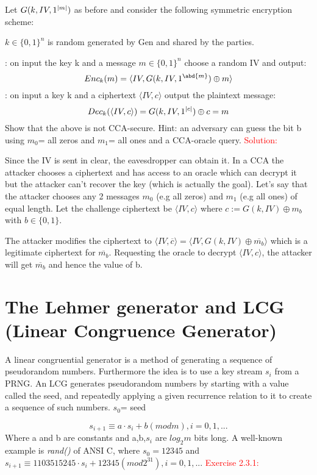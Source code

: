 \documentclass{article}
\newcommand*\xor{\mathbin{\oplus}}
\begin{document}
Let $G(k,IV,1^{\abs{m}})$ as before and consider the following symmetric encryption scheme:

$k \in \{0,1\}^n$ is random generated by Gen and shared by the parties.

: on input the key k and a message $m \in \{0,1\}^n$ choose a random IV and output:
\begin{equation*}
    Enc_k(m)=\langle IV,G(k,IV,1^{\abd{m}}) \xor m \rangle
\end{equation*}
: on input a key k and a ciphertext $\langle IV,c \rangle$ output the plaintext message:
\begin{equation*}
    Dec_k(\langle IV,c \rangle)=G(k,IV,1^{\abs{c}}) \xor c=m
\end{equation*}
Show that the above is not CCA-secure. Hint: an adversary can guess the bit b using $m_0$= all zeros and $m_1$= all ones and a CCA-oracle query. \newline
\textcolor{red}{Solution:}

Since the IV is sent in clear, the eavesdropper can obtain it. In a CCA the attacker chooses a ciphertext and has access to an oracle which can decrypt it but the attacker can't recover the key (which is actually the goal).
Let's say that the attacker chooses any 2 messages $m_0$ (e.g all zeros) and $m_1$ (e.g all ones) of equal length.
Let the challenge ciphertext be $\langle IV,c \rangle$ where $c:=G(k,IV)\xor m_b$ with $b \in \{0,1\}$.

The attacker modifies the ciphertext to $\langle IV,\overline{ c}\rangle = \langle IV,G(k,IV)\xor \overline{m_b}\rangle$ which is a legitimate ciphertext for $\overline{m_b}$. Requesting the oracle to decrypt $\langle IV,c\rangle$, the attacker will get $\overline{m_b}$ and hence the value of b.

\section{The Lehmer generator and LCG (Linear Congruence Generator)}
A linear congruential generator is a method of generating a sequence of pseudorandom numbers. Furthermore the idea is to use a key stream $s_i$ from a PRNG. An LCG generates pseudorandom numbers by starting with a value called the seed, and repeatedly applying a given recurrence relation to it to create a sequence of such numbers. 
$s_0$= seed

\begin{equation*}
    s_{i+1} \equiv a\cdot s_i + b(mod m), i=0,1,...
\end{equation*}
Where a and b are constants and a,b,$s_i$ are $log_2m$ bits long.
A well-known example is \textit{rand()} of ANSI C, where $s_0 = 12345$ and $s_{i+1} \equiv 1103515245 \cdot s_i + 12345(mod 2^31), i=0,1,...$ \newline
\textcolor{red}{Exercise 2.3.1:}
\end{document}
